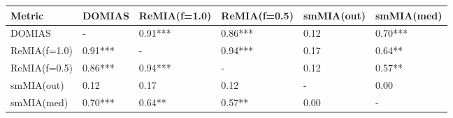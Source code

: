 \begin{tabular}{llllll}
    \toprule
    Metric & DOMIAS & ReMIA(f=1.0) & ReMIA(f=0.5) & smMIA(out) & smMIA(med) \\
    \midrule
    DOMIAS & - & 0.91*** & 0.86*** & 0.12 & 0.70*** \\
    ReMIA(f=1.0) & 0.91*** & - & 0.94*** & 0.17 & 0.64** \\
    ReMIA(f=0.5) & 0.86*** & 0.94*** & - & 0.12 & 0.57** \\
    smMIA(out) & 0.12 & 0.17 & 0.12 & - & 0.00 \\
    smMIA(med) & 0.70*** & 0.64** & 0.57** & 0.00 & - \\
    \bottomrule
\end{tabular}

